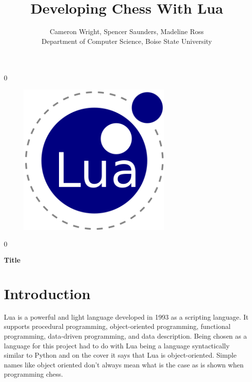 \documentclass[12pt]{article}
\newcommand{\blind}{0}
\begin{document}
%

\def\spacingset#1{\renewcommand{\baselinestretch}%
{#1}\small\normalsize} \spacingset{1}



\blind
{
  \title{\bf Developing Chess With Lua}
  
\begin{figure}
\begin{center}
\includegraphics[width=3in]{luaLogo.png}
\end{center}
\end{figure}
  
  \author{Cameron Wright, Spencer Saunders, Madeline Ross 
    \\Department of Computer Science, Boise State University}
  \maketitle
} \fi

\blind
{
  \bigskip
  \bigskip
  \bigskip
  \begin{center}
    {\LARGE\bf Title}
\end{center}
  \medskip
} \fi



\noindent%
\vfill

\newpage
\spacingset{1.45} %
\section{Introduction}

Lua is a powerful and light language developed in 1993 as a scripting language. It supports procedural programming, object-oriented programming, functional programming, data-driven programming, and data description.  Being chosen as a language for this project had to do with Lua being a language syntactically similar to Python and on the cover it says that Lua is object-oriented.  Simple names like object oriented don't always mean what is the case as is shown when programming chess.
\end{document}
